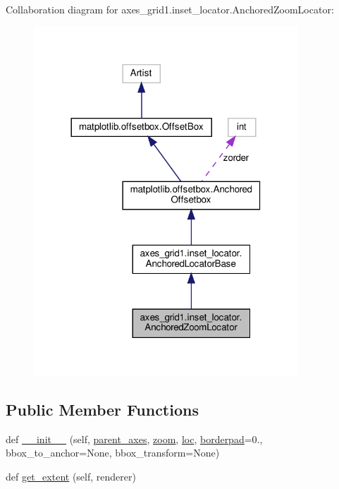 Collaboration diagram for axes\+\_\+grid1.\+inset\+\_\+locator.\+Anchored\+Zoom\+Locator\+:
\nopagebreak
\begin{figure}[H]
\begin{center}
\leavevmode
\includegraphics[width=281pt]{classaxes__grid1_1_1inset__locator_1_1AnchoredZoomLocator__coll__graph}
\end{center}
\end{figure}
\subsection*{Public Member Functions}
\begin{DoxyCompactItemize}
\item 
def \hyperlink{classaxes__grid1_1_1inset__locator_1_1AnchoredZoomLocator_a6e0c76c193e3d40c8002ec5ad3e101ac}{\+\_\+\+\_\+init\+\_\+\+\_\+} (self, \hyperlink{classaxes__grid1_1_1inset__locator_1_1AnchoredZoomLocator_a72a7f6c7b2569806ed73888940e407aa}{parent\+\_\+axes}, \hyperlink{classaxes__grid1_1_1inset__locator_1_1AnchoredZoomLocator_afcf96036d6ae8321177a4f4bac617812}{zoom}, \hyperlink{classmatplotlib_1_1offsetbox_1_1AnchoredOffsetbox_acff8512cc529c0576658d3d3102f68ad}{loc}, \hyperlink{classmatplotlib_1_1offsetbox_1_1AnchoredOffsetbox_a50d24143d0fabb11a481b3d85b62a19a}{borderpad}=0., bbox\+\_\+to\+\_\+anchor=None, bbox\+\_\+transform=None)
\item 
def \hyperlink{classaxes__grid1_1_1inset__locator_1_1AnchoredZoomLocator_a1d44c56370c597e347afbc29da56020a}{get\+\_\+extent} (self, renderer)
\end{DoxyCompactItemize}

